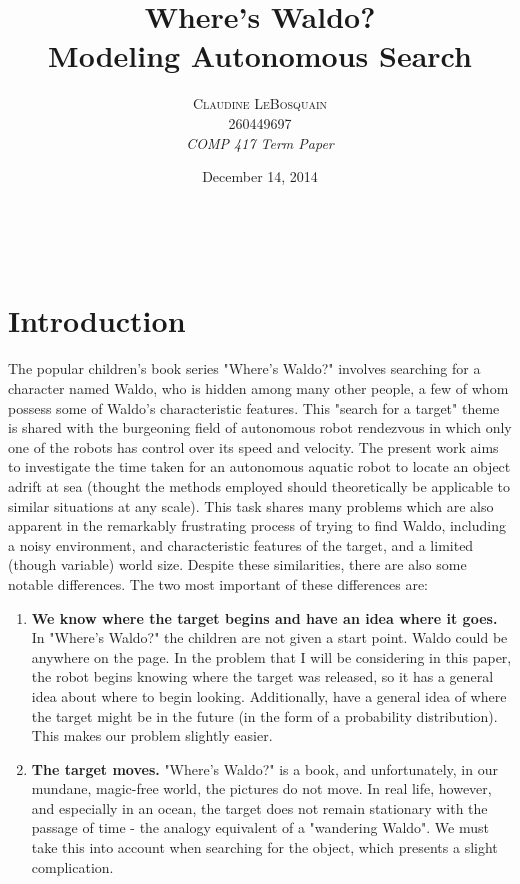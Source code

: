 \documentclass[a4paper, 11pt]{article} %
\title{\textbf{Where's Waldo?}\\ %
 Modeling Autonomous Search} %
\author{\textsc{Claudine LeBosquain} %
\\{260449697}%
\\{\textit{COMP 417 Term Paper}}} %
\date{December 14, 2014} %
\makeatletter
\renewcommand{\maketitle}{ %
\begin{flushright} %
{\LARGE\@title} %

\vspace{20pt} %

{\large\@author} %
\\\@date %

\end{flushright}
}
\makeatother
\begin{document}
\maketitle %


\section*{Introduction}

The popular children's book series "Where's Waldo?" involves searching for a character named Waldo, who is hidden among many other people, a few of whom possess some of Waldo's characteristic features. This "search for a target" theme is shared with the burgeoning field of autonomous robot rendezvous in which only one of the robots has control over its speed and velocity. The present work aims to investigate the time taken for an autonomous aquatic robot to locate an object adrift at sea (thought the methods employed should theoretically be applicable to similar situations at any scale). This task shares many problems which are also apparent in the remarkably frustrating process of trying to find Waldo, including a noisy environment, and characteristic features of the target, and a limited (though variable) world size. Despite these similarities, there are also some notable differences. The two most important of these differences are: 
\begin{enumerate}
\item \textbf{We know where the target begins and have an idea where it goes.} In "Where's Waldo?" the children are not given a start point. Waldo could be anywhere on the page. In the problem that I will be considering in this paper, the robot begins knowing where the target was released, so it has a general idea about where to begin looking. Additionally, have a general idea of where the target might be in the future (in the form of a probability distribution). This makes our problem slightly easier. 
\item \textbf{The target moves.} "Where's Waldo?" is a book, and unfortunately, in our mundane, magic-free world, the pictures do not move. In real life, however, and especially in an ocean, the target does not remain stationary with the passage of time - the analogy equivalent of a "wandering Waldo". We must take this into account when searching for the object, which presents a slight complication.
\end{enumerate} 
\end{document}
